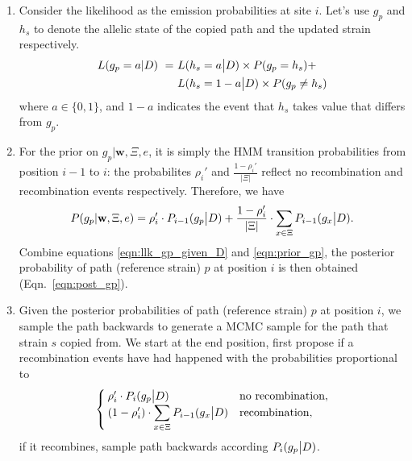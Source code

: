 \documentclass{bioinfo}
\begin{document}
\begin{enumerate}
\item Consider the likelihood as the emission probabilities at site $i$. Let's use $g_p$ and $h_s$ to denote the allelic state of the copied path and the updated strain respectively.
\begin{equation*}
\begin{split}
L(g_p = a | D) ~ = ~ & L(h_s = a \big{|} D) \times P(g_p = h_s) + \\
                     & L(h_s = 1 - a \big{|} D) \times P(g_p \neq h_s) \label{eqn:llk_gp_given_D}
\end{split}
\end{equation*}
where $a\in \{0,1\}$, and $1-a$ indicates the event that $h_s$ takes value that differs from $g_p$.

\item For the prior on $g_p|\mathbf{w}, \Xi, e$, it is simply the \citet{Li2003} HMM transition probabilities from position $i-1$ to $i$: the probabilites $\rho_i'$ and $\frac{1-\rho_i'}{|\Xi|}$ reflect no recombination and recombination events respectively. Therefore, we have
\begin{equation}
P(g_p|\mathbf{w}, \Xi, e) = \rho_i' \cdot P_{i-1}(g_p \big{|} D)  +  \frac{1-\rho_i'}{|\Xi|} \cdot \displaystyle\sum_{x\in \Xi} P_{i-1} (g_x \big{|} D).\label{eqn:prior_gp}
\end{equation}
Combine equations \eqref{eqn:llk_gp_given_D} and \eqref{eqn:prior_gp}, the posterior probability of path (reference strain) $p$ at position $i$ is then obtained (Eqn.~\eqref{eqn:post_gp}).


\item Given the posterior probabilities of path (reference strain) $p$ at position $i$, we sample the path backwards to generate a MCMC sample for the path that strain $s$ copied from. We start at the end position, first propose if a recombination events have had happened with the probabilities proportional to
$$
\begin{cases}
\rho_i' \cdot P_i(g_p \big{|} D) & \text{no recombination},\\
\displaystyle ( 1-\rho_i' ) \cdot \sum_{x\in \Xi} P_{i-1}(g_x \big{|} D) & \text{recombination},
\end{cases}
$$
if it recombines, sample path backwards according $P_i(g_p \big{|} D)$.


\end{enumerate}
\end{document}
